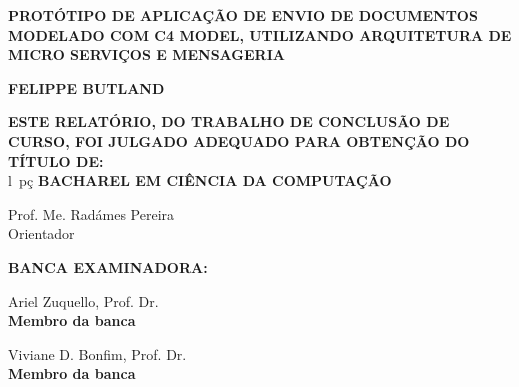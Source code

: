 
    \OnehalfSpacing
    \begin{center}
        \ABNTEXchapterfont%

        \MakeTextUppercase{\textbf{PROTÓTIPO DE APLICAÇÃO DE ENVIO DE DOCUMENTOS MODELADO COM C4
        MODEL, UTILIZANDO ARQUITETURA DE MICRO SERVIÇOS E MENSAGERIA}}

        \vspace{2\baselineskip}

        \MakeTextUppercase{\textbf{Felippe Butland}}

        \vspace{2\baselineskip}
        
        \MakeTextUppercase{\textbf{ESTE RELATÓRIO, DO TRABALHO DE CONCLUSÃO DE CURSO, FOI JULGADO ADEQUADO PARA OBTENÇÃO DO TÍTULO DE:}}\\
        l~pç\vspace{\baselineskip}
        \MakeTextUppercase{\textbf{BACHAREL EM CIÊNCIA DA COMPUTAÇÃO} }
        
        \vspace{3\baselineskip}

        \textmd{Prof. Me. Radámes Pereira}\\
        Orientador\\
    \end{center}

    \vspace{2\baselineskip}
    \noindent
    \textbf{BANCA EXAMINADORA:}\\
   
    \vspace{3\baselineskip}

    \noindent
    \begin{minipage}{0.5\textwidth}
        \mdseries
        \SingleSpacing
        \centering

        \textmd{Ariel Zuquello}, \textmd{Prof. Dr.}\\
        \textbf{Membro da banca}
    \end{minipage}
    \hfill
    \begin{minipage}{0.5\textwidth}
        \mdseries
        \SingleSpacing
        \centering

        \textmd{Viviane D. Bonfim}, \textmd{Prof. Dr.}\\
        \textbf{Membro da banca}
    \end{minipage}\\

